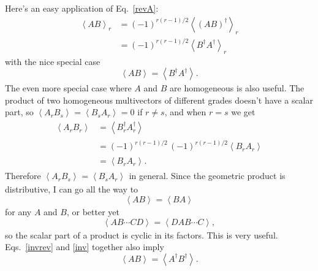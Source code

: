 \documentclass{utarticle}
\newcommand{\rev}[1]{\ensuremath{#1^\dagger}}
\newcommand{\grade}[2][]{\ensuremath{\left\langle #2 \right\rangle_{#1}}}
\begin{document}
Here's an easy application of Eq.~\eqref{revA}:
\begin{align}
\grade[r]{A B} & = (-1)^{r(r-1)/2} \grade[r]{\rev{(A B)}} \nonumber \\
 & = (-1)^{r(r-1)/2} \grade[r]{\rev{B} \rev{A}}
\end{align}
with the nice special case
\begin{equation} \grade{A B} = \grade{\rev{B} \rev{A}}. \label{invrev} \end{equation}
The even more special case where $A$ and $B$ are homogeneous is also useful.  The
product of two homogeneous multivectors of different grades doesn't have a 
scalar part, so $\grade{A_r B_s} = \grade{B_s A_r} = 0$ if $r \neq s$, and when $r = s$ we get
\begin{align}
\grade{A_r B_r} & = \grade{\rev{B_r} \rev{A_r}} \nonumber \\
 & = (-1)^{r(r-1)/2}\,(-1)^{r(r-1)/2} \grade{B_r A_r} \nonumber \\
 & = \grade{B_r A_r}.
\end{align}
Therefore $\grade{A_r B_s} = \grade{B_s A_r}$ in general.  Since the geometric
product is distributive, I can go all the way to
\begin{equation}
\grade{A B} = \grade{B A}
\label{inv}
\end{equation}
for any $A$ and $B$, or better yet
\begin{equation} 
\grade{A B \dotsb C D} = \grade{D A B \dotsb C}, 
\label{cyclic}
\end{equation}
so the scalar part of a product is cyclic in its factors.  This is
very useful.  Eqs.~\eqref{invrev} and \eqref{inv} together also imply
\begin{equation} \grade{A B} = \grade{\rev{A} \rev{B}}. \end{equation}
\end{document}
